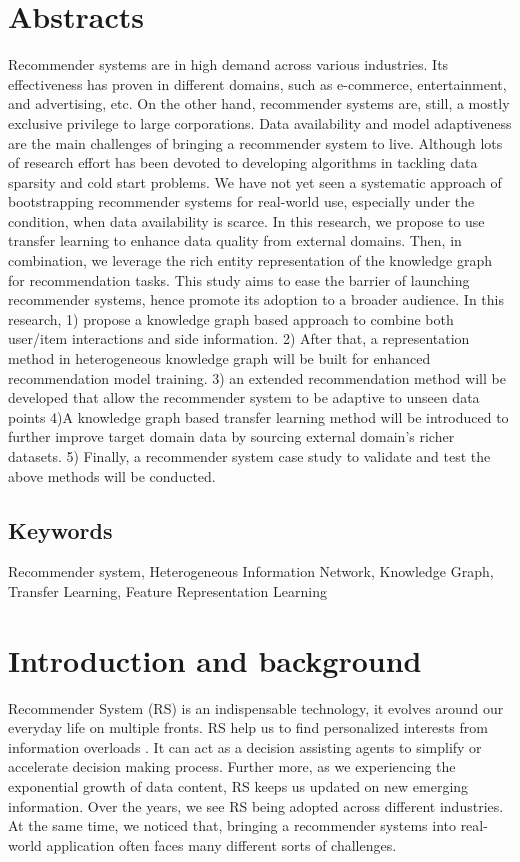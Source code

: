 
\section*{Abstracts}
Recommender systems are in high demand across various industries. Its effectiveness has proven in different domains, such as e-commerce, entertainment, and advertising, etc. On the other hand, recommender systems are, still, a mostly exclusive privilege to large corporations. Data availability and model adaptiveness are the main challenges of bringing a recommender system to live. Although lots of research effort has been devoted to developing algorithms in tackling data sparsity and cold start problems. We have not yet seen a systematic approach of bootstrapping recommender systems for real-world use, especially under the condition, when data availability is scarce. In this research, we propose to use transfer learning to enhance data quality from external domains. Then, in combination, we leverage the rich entity representation of the knowledge graph for recommendation tasks. This study aims to ease the barrier of launching recommender systems, hence promote its adoption to a broader audience. In this research, 1) propose a knowledge graph based approach to combine both user/item interactions and side information. 2) After that, a representation method in heterogeneous knowledge graph will be built for enhanced recommendation model training. 3) an extended recommendation method will be developed that allow the recommender system to be adaptive to unseen data points 4)A knowledge graph based transfer learning method will be introduced to further improve target domain data by sourcing external domain's richer datasets. 5) Finally, a recommender system case study to validate and test the above methods will be conducted.

\subsection*{Keywords} 
Recommender system, Heterogeneous Information Network, Knowledge Graph, Transfer Learning, Feature Representation Learning

\section{Introduction and background}
Recommender System (RS) is an indispensable technology, it evolves around our everyday life on multiple fronts. RS help us to find personalized interests from information overloads \citep{Lu2015}. It can act as a decision assisting agents to simplify or accelerate decision making process. Further more, as we experiencing the exponential growth of data content, RS keeps us updated on new emerging information.
Over the years, we see RS being adopted across different industries. At the same time, we noticed that, bringing a recommender systems into real-world application often faces many different sorts of challenges. 

